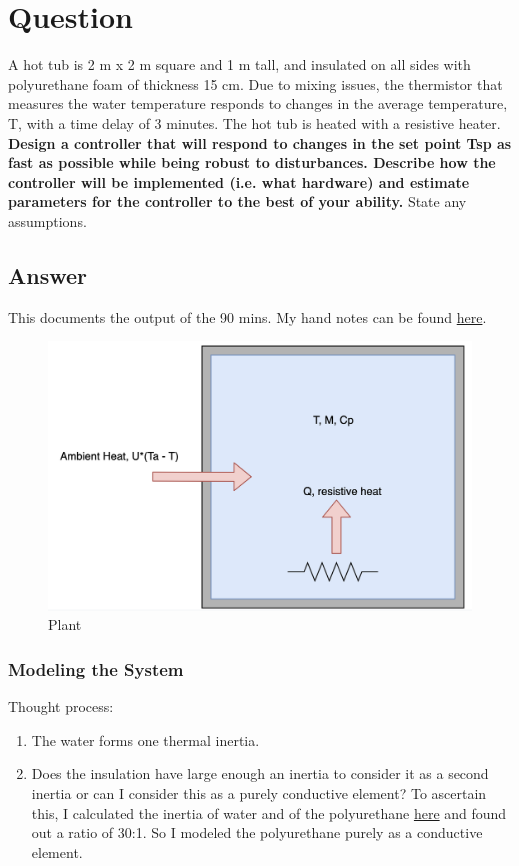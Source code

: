 \section{Question}
A hot tub is 2 m x 2 m square and 1 m tall, and insulated on all sides with polyurethane
foam of thickness 15 cm. Due to mixing issues, the thermistor that measures the water
temperature responds to changes in the average temperature, T, with a time delay of 3
minutes. The hot tub is heated with a resistive heater. \textbf{Design a controller that will
respond to changes in the set point Tsp as fast as possible while being robust to
disturbances. Describe how the controller will be implemented (i.e. what hardware)
and estimate parameters for the controller to the best of your ability.} State any
assumptions.

\subsection *{Answer}

This documents the output of the 90 mins. My hand notes can be found \href{https://bit.ly/test_treau}{here}.

\begin{figure}[h!]
  \includegraphics[scale=0.4]{plant}
  \caption{Plant}
\end{figure}

\subsubsection *{Modeling the System}

Thought process:
\begin{enumerate}
  \item The water forms one thermal inertia.
  \item Does the insulation have large enough an inertia to consider it as a second inertia or can I consider this as a purely conductive element? To ascertain this, I calculated the inertia of water and of the polyurethane \href{https://bit.ly/treaucalcs}{here} and found out a ratio of 30:1. So I modeled the polyurethane purely as a conductive element. 
\end{enumerate}

